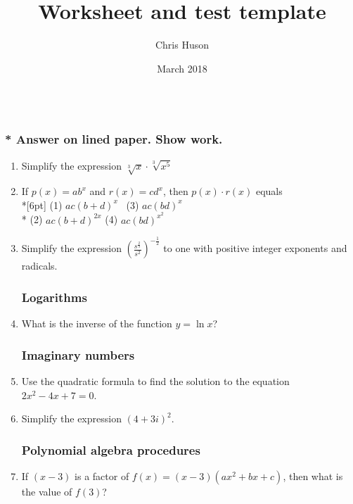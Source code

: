 \documentclass[12pt, oneside]{article}
\title{Worksheet and test template}
\author{Chris Huson}
\date{March 2018}
\begin{document}
\subsubsection*{\\* Answer on lined paper. Show work.}

\begin{enumerate}

\vspace{0.5 cm}

\subsubsection*{Rational exponents and radicals}

\item Simplify the expression $\sqrt[3]{x} \cdot \sqrt[3]{x^5}$

\item If $p(x)=ab^x$ and $r(x)=cd^x$, then $p(x) \cdot r(x)$ equals \\*[6pt]
(1) $ac(b+d)^x$ \, \qquad (3) $ac(bd)^x$\\* 
(2) $ac(b+d)^{2x}$ \qquad (4) $ac(bd)^{x^2}$


\item Simplify the expression $\displaystyle \left( \frac{s^{\frac{2}{3}}}{s^2} \right)^{-\frac{1}{2}}$ to one with positive integer exponents and radicals.

\subsubsection*{Logarithms}
\item What is the inverse of the function $y=\ln x$?


\subsubsection*{Imaginary numbers}
\item Use the quadratic formula to find the solution to the equation $2x^2-4x+7=0$.
\item Simplify the expression $(4+3i)^2$.


\subsubsection*{Polynomial algebra procedures}

\item If $(x-3)$ is a factor of $f(x)=(x-3)(ax^2+bx+c)$, then what is the value of $f(3)$?


\end{enumerate}
\end{document}
